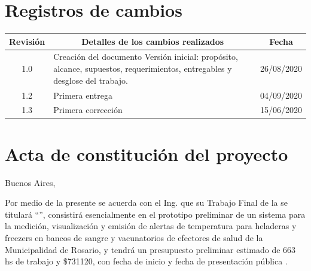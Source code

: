 \documentclass[11pt]{charter}
\begin{document}
\maketitle
\thispagestyle{empty}
\pagebreak


\thispagestyle{empty}
{\setlength{\parskip}{0pt}
\tableofcontents{}
}
\pagebreak


\section{Registros de cambios}
\label{sec:registro}


\begin{table}[ht]
\label{tab:registro}
\centering
\begin{tabularx}{\linewidth}{@{}|c|X|c|@{}}
\hline
\rowcolor[HTML]{C0C0C0} 
Revisión & \multicolumn{1}{c|}{\cellcolor[HTML]{C0C0C0}Detalles de los cambios realizados} & Fecha      \\ \hline
1.0      & Creación del documento \newline Versión inicial: propósito, alcance, supuestos, requerimientos, entregables y desglose del trabajo.
                                         & 26/08/2020 \\ \hline
1.2      & Primera entrega                                                                 & 04/09/2020 \\ \hline
1.3      & Primera corrección &15/06/2020\\\hline
\end{tabularx}
\end{table}

\pagebreak



\section{Acta de constitución del proyecto}
\label{sec:acta}

\begin{flushright}
Buenos Aires, \fechaInicioName
\end{flushright}

\vspace{2cm}

Por medio de la presente se acuerda con el Ing. \authorname\hspace{1px} que su Trabajo Final de la \degreename\hspace{1px} se titulará ``\ttitle'', consistirá esencialmente en el prototipo preliminar de un sistema para la medición, visualización y emisión de alertas de temperatura para heladeras y freezers en bancos de sangre y vacunatorios de efectores de salud de la Municipalidad de Rosario, y tendrá un presupuesto preliminar estimado de 663 hs de trabajo y {\$731120}, con fecha de inicio \fechaInicioName\hspace{1px} y fecha de presentación pública \fechaFinalName.
\end{document}
